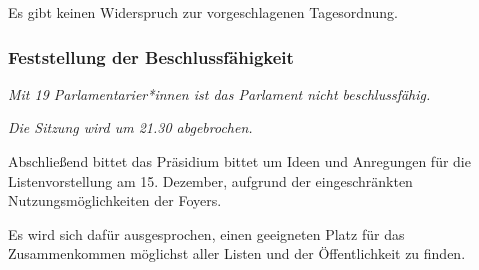 \documentclass[ngerman,headheight=70pt]{scrartcl}
\begin{document}
    Es gibt keinen Widerspruch zur vorgeschlagenen Tagesordnung.

    \subsubsection{Feststellung der Beschlussfähigkeit}

    \textit{Mit 19 Parlamentarier*innen ist das Parlament nicht beschlussfähig.}

    \textit{Die Sitzung wird um 21.30 abgebrochen.}

    Abschließend bittet das Präsidium bittet um Ideen und Anregungen für die
    Listenvorstellung am 15. Dezember, aufgrund der eingeschränkten
    Nutzungsmöglichkeiten der Foyers.

    Es wird sich dafür ausgesprochen, einen geeigneten Platz für das
    Zusammenkommen möglichst aller Listen und der Öffentlichkeit zu finden.
\end{document}
